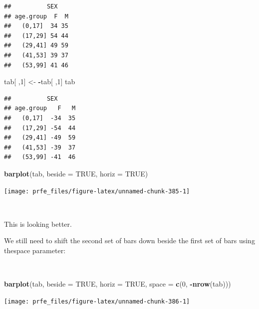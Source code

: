 \documentclass[12pt,a4paper]{book}
\newenvironment{Shaded}{\begin{snugshade}}{\end{snugshade}}
\newcommand{\KeywordTok}[1]{\textcolor[rgb]{0.13,0.29,0.53}{\textbf{#1}}}
\newcommand{\DataTypeTok}[1]{\textcolor[rgb]{0.13,0.29,0.53}{#1}}
\newcommand{\DecValTok}[1]{\textcolor[rgb]{0.00,0.00,0.81}{#1}}
\newcommand{\StringTok}[1]{\textcolor[rgb]{0.31,0.60,0.02}{#1}}
\newcommand{\OtherTok}[1]{\textcolor[rgb]{0.56,0.35,0.01}{#1}}
\newcommand{\OperatorTok}[1]{\textcolor[rgb]{0.81,0.36,0.00}{\textbf{#1}}}
\newcommand{\NormalTok}[1]{#1}
\theoremstyle{definition}
\theoremstyle{definition}
\theoremstyle{definition}
\theoremstyle{remark}
\begin{document}
\begin{verbatim}
##          SEX
## age.group  F  M
##   (0,17]  34 35
##   (17,29] 54 44
##   (29,41] 49 59
##   (41,53] 39 37
##   (53,99] 41 46
\end{verbatim}

\begin{Shaded}
\begin{Highlighting}[]
\NormalTok{tab[ ,}\DecValTok{1}\NormalTok{] <-}\StringTok{ }\OperatorTok{-}\NormalTok{tab[ ,}\DecValTok{1}\NormalTok{]}
\NormalTok{tab}
\end{Highlighting}
\end{Shaded}

\begin{verbatim}
##          SEX
## age.group   F   M
##   (0,17]  -34  35
##   (17,29] -54  44
##   (29,41] -49  59
##   (41,53] -39  37
##   (53,99] -41  46
\end{verbatim}

\begin{Shaded}
\begin{Highlighting}[]
\KeywordTok{barplot}\NormalTok{(tab, }\DataTypeTok{beside =} \OtherTok{TRUE}\NormalTok{, }\DataTypeTok{horiz =} \OtherTok{TRUE}\NormalTok{)}
\end{Highlighting}
\end{Shaded}

\begin{center}\texttt{[image: prfe\_files/figure-latex/unnamed-chunk-385-1]} \end{center}

~

This is looking better.

We still need to shift the second set of bars down beside the first set
of bars using thespace parameter:

~

\begin{Shaded}
\begin{Highlighting}[]
\KeywordTok{barplot}\NormalTok{(tab, }\DataTypeTok{beside =} \OtherTok{TRUE}\NormalTok{, }\DataTypeTok{horiz =} \OtherTok{TRUE}\NormalTok{, }\DataTypeTok{space =} \KeywordTok{c}\NormalTok{(}\DecValTok{0}\NormalTok{, }\OperatorTok{-}\KeywordTok{nrow}\NormalTok{(tab)))}
\end{Highlighting}
\end{Shaded}

\begin{center}\texttt{[image: prfe\_files/figure-latex/unnamed-chunk-386-1]} \end{center}
\end{document}
